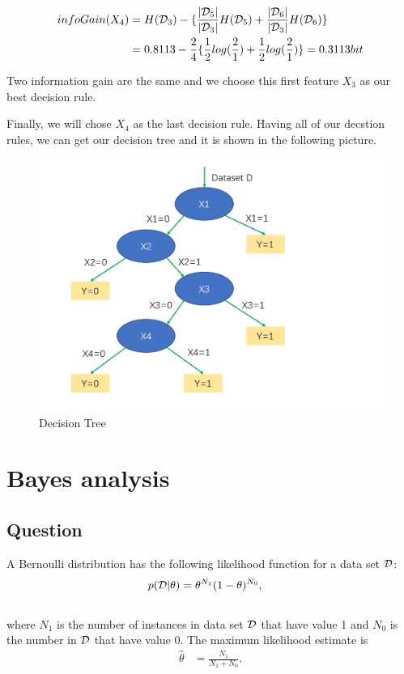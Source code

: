 \documentclass[10pt]{article}
\begin{document}
    \begin{equation}
    \begin{aligned}
    infoGain(X_4)&=H({\cal D}_3)-\{\frac{\vert {\cal D}_5\vert}{\vert {\cal D}_3\vert}H({\cal D}_5)+\frac{\vert {\cal D}_6\vert}{\vert {\cal D}_3\vert}H({\cal D}_6)\}\\
    &=0.8113-\frac{2}{4}\{ \frac{1}{2}log(\frac{2}{1})+\frac{1}{2}log(\frac{2}{1})\}=0.3113 bit
    \end{aligned}
    \end{equation} \par
	Two information gain are the same and we choose this first feature $X_3$ as our best decision rule.\par
	Finally, we will chose $X_4$ as the last decision rule. Having all of our decstion rules, we can get our decision tree and it is shown in the following picture.\\
	\begin{figure}
		\begin{center}
		\includegraphics[scale=0.65]{decision_tree.jpg}
		\caption{Decision Tree}
		\end{center}
	\end{figure}
	
	
	
	
			
	
	\section{Bayes analysis}
	\subsection{Question}
	A Bernoulli distribution has the following likelihood function for a data set $\cal D$:
	\begin{align}
	p({\cal D} | \theta) &= \theta^{N_1} (1 - \theta)^{N_0},
	\label{eq:bernoulli}
	\end{align}\\
	where $N_1$ is the number of instances in data set $\cal D$ that have value 1 and $N_0$ is the number in $\cal D$ that have value 0. The maximum likelihood estimate is 
	\begin{align}
	\hat{\theta} &= \frac{N_1}{N_1 + N_0}.
	\label{eq:mle}
	\end{align}
	
\end{document}
